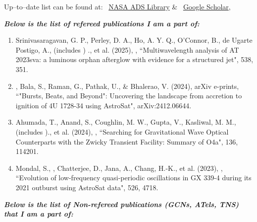 \small
Up--to--date list can be found at: 
\faGlobe~\href{https://ui.adsabs.harvard.edu/search/q=orcid%3A0000-0003-3173-4691&sort=date+desc}{NASA ADS Library} \& \faIcon{google}~\href{https://scholar.google.com/citations?user=BdMzZJ4AAAAJ}{Google Scholar}, 
\\
\vspace{0.5em}
\normalsize

\textit{\textbf{Below is the list of refereed publications I am a part of:}}
\begin{enumerate}[leftmargin=*]
\item Srinivasaragavan, G. P., Perley, D. A., Ho, A. Y. Q., O'Connor, B., de Ugarte Postigo, A.,  (includes \me) ., et al. (2025), \mnras, {``Multiwavelength analysis of AT 2023sva: a luminous orphan afterglow with evidence for a structured jet"}, 538, 351.

\item \me, Bala, S., Raman, G., Pathak, U., \& Bhalerao, V. (2024), arXiv e-prints, {``"Bursts, Beats, and Beyond": Uncovering the landscape from accretion to ignition of 4U 1728-34 using AstroSat"}, arXiv:2412.06644.

\item Ahumada, T., Anand, S., Coughlin, M. W., Gupta, V., Kasliwal, M. M., (includes \me)., et al. (2024), \pasp, {``Searching for Gravitational Wave Optical Counterparts with the Zwicky Transient Facility: Summary of O4a"}, 136, 114201.

\item Mondal, S., \me, Chatterjee, D., Jana, A., Chang, H.-K., et al. (2023), \mnras, {``Evolution of low-frequency quasi-periodic oscillations in GX 339-4 during its 2021 outburst using AstroSat data"}, 526, 4718.

\end{enumerate}

\textit{\textbf{Below is the list of Non-refereed publications (GCNs, ATels, TNS) that I am a part of:}}

